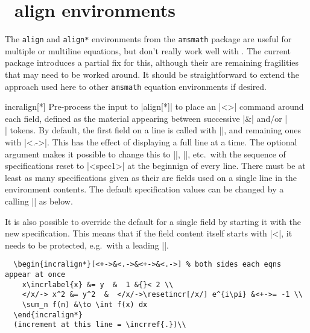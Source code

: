 \documentclass[a4paper]{ltxdoc}
\begin{document}
\section{\AmSTeX\ align environments}

The \texttt{align} and \texttt{align*} environments from the \texttt{amsmath}
package are useful for multiple or multiline equations, but don't really work
well with \beamer.  The current package introduces a partial fix for this,
although their are remaining fragilities that may need to be worked around.  It
should be straightforward to extend the approach used here to other
\texttt{amsmath} equation environments if desired.


\begin{environment}{{incralign[*]}}
    Pre-process the input to |align[*]| to place an |\onslide<>{}| command
    around each field, defined as the material appearing between successive |&|
    and/or |\\| tokens.  By default, the first field on a line is called with
    |\onslide<+->{}|, and remaining ones with ||.  This has the
    effect of displaying a full line at a time.  The optional argument makes it
    possible to change this to ||, ||, etc.\ with
    the sequence of specifications reset to |<spec1>| at the beginnign of every
    line. There must be at least as many specifications given as their are
    fields used on a single line in the environment contents.  The default
    specification values can be changed by a calling |\incraligndefaultspec| as
    below.

    It is also possible to override the default for a single field by starting
    it with the new specification.  This means that if the field content itself
    starts with |<|, it needs to be protected, e.g.\ with a leading |{}|.

    \example
\begin{verbatim}
  \begin{incralign*}[<+->&<.->&<+->&<.->] % both sides each eqns appear at once
    x\incrlabel{x} &= y  &  1 &{}< 2 \\
    </x/-> x^2 &= y^2  &  </x/->\resetincr[/x/] e^{i\pi} &<+->= -1 \\
    \sum_n f(n) &\to \int f(x) dx
  \end{incralign*}
  (increment at this line = \incrref{.})\\
\end{verbatim}
    

\end{environment}
\end{document}
